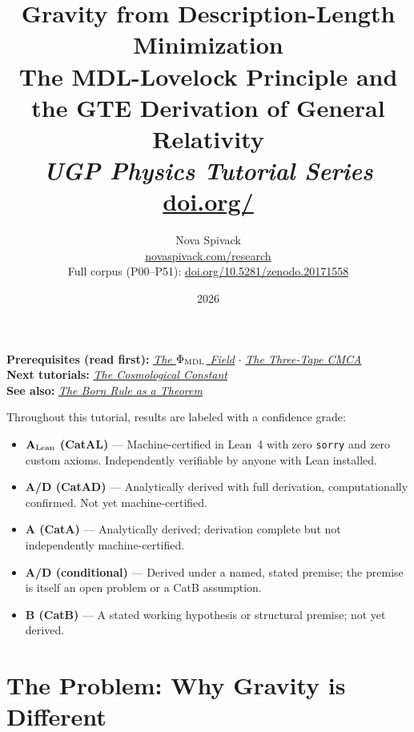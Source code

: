 \documentclass[11pt,a4paper]{article}
\title{\textbf{Gravity from Description-Length Minimization}\\[6pt]
\large The MDL-Lovelock Principle and the GTE Derivation of General Relativity\\[4pt]\normalsize\textit{UGP Physics Tutorial Series}
\\[2pt]\small\href{https://doi.org/\TutorialDOI}{doi.org/\TutorialDOI}}
\author{Nova Spivack\\[4pt]
\normalsize
\href{https://novaspivack.com/research}{novaspivack.com/research}\\[2pt]
\small Full corpus (P00--P51):
\href{https://doi.org/10.5281/zenodo.20171558}{doi.org/10.5281/zenodo.20171558}
}
\date{2026}
\begin{document}
\setcounter{tocdepth}{2}
\maketitle
\tableofcontents
\newpage

\begin{tcolorbox}[colback=blue!6,colframe=blue!40!black,
  title=\textbf{UGP Physics Tutorial Series}]
\textbf{Prerequisites (read first):} \href{https://doi.org/10.5281/zenodo.20657885}{\emph{The $\Phi_{\rm MDL}$ Field}} $\cdot$ \href{https://doi.org/10.5281/zenodo.20657906}{\emph{The Three-Tape CMCA}}\\[4pt]
\textbf{Next tutorials:} \href{https://doi.org/10.5281/zenodo.20657864}{\emph{The Cosmological Constant}}\\[4pt]
\textbf{See also:} \href{https://doi.org/10.5281/zenodo.20657861}{\emph{The Born Rule as a Theorem}}
\end{tcolorbox}

\begin{tcolorbox}[colback=boxgreen,colframe=green!50!black,
  title=\textbf{Claim-Strength Taxonomy}]
Throughout this tutorial, results are labeled with a confidence grade:
\begin{itemize}[itemsep=2pt]
  \item \textbf{$\mathbf{A}_{\rm Lean}$ (CatAL)} --- Machine-certified in Lean~4 with zero \texttt{sorry} and zero custom axioms.  Independently verifiable by anyone with Lean installed.
  \item \textbf{A/D (CatAD)} --- Analytically derived with full derivation, computationally confirmed.  Not yet machine-certified.
  \item \textbf{A (CatA)} --- Analytically derived; derivation complete but not independently machine-certified.
  \item \textbf{A/D (conditional)} --- Derived under a named, stated premise; the premise is itself an open problem or a CatB assumption.
  \item \textbf{B (CatB)} --- A stated working hypothesis or structural premise; not yet derived.
\end{itemize}
\end{tcolorbox}


\section{The Problem: Why Gravity is Different}
\end{document}
